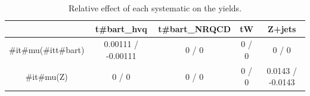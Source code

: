 \documentclass[10pt]{article}
\begin{document}
\begin{table}[htbp]
\begin{center}
\begin{tabular}{|c|c|c|c|c|}
\hline 
      & t#bar{t}_{hvq}      & t#bar{t}_{NRQCD}      & tW      & Z+jets \\ 
\hline 
  #it{#mu}(#it{t#bar{t}}) & 0.00111 / -0.00111 & 0 / 0 & 0 / 0 & 0 / 0 \\ 
  #it{#mu}(Z) & 0 / 0 & 0 / 0 & 0 / 0 & 0.0143 / -0.0143 \\ 
\hline 
\end{tabular} 
\caption{Relative effect of each systematic on the yields.} 
\end{center} 
\end{table} 
\end{document}
